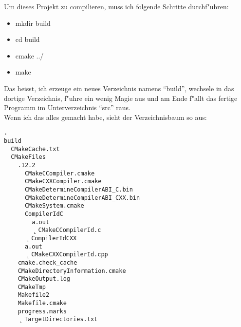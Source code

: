 \documentclass[german,a4paper]{report}
\begin{document}
Um dieses Projekt zu compilieren, muss ich folgende Schritte
durchf"uhren:
\begin{itemize}
\item mkdir build
\item cd build
\item cmake ../
\item make
\end{itemize}
Das heisst, ich erzeuge ein neues Verzeichnis namens ``build'',
wechsele in das dortige Verzeichnis, f"uhre ein wenig Magie aus
und am Ende f"allt das fertige Programm im Unterverzeichnis ``src''
raus.\\
Wenn ich das alles gemacht habe, sieht der Verzeichnisbaum so aus:
\begin{alltt}
.
\textbar\textendash\textendash build
\textbar\ \  \textbar\textendash\textendash CMakeCache.txt
\textbar\ \  \textbar\textendash\textendash CMakeFiles
\textbar\ \  \textbar\ \  \textbar\textendash{}.12.2
\textbar\ \  \textbar\ \  \textbar\ \  \textbar\textendash\textendash CMakeCCompiler.cmake
\textbar\ \  \textbar\ \  \textbar\ \  \textbar\textendash\textendash CMakeCXXCompiler.cmake
\textbar\ \  \textbar\ \  \textbar\ \  \textbar\textendash\textendash CMakeDetermineCompilerABI\_C.bin
\textbar\ \  \textbar\ \  \textbar\ \  \textbar\textendash\textendash CMakeDetermineCompilerABI\_CXX.bin
\textbar\ \  \textbar\ \  \textbar\ \  \textbar\textendash\textendash CMakeSystem.cmake
\textbar\ \  \textbar\ \  \textbar\ \  \textbar\textendash\textendash CompilerIdC
\textbar\ \  \textbar\ \  \textbar\ \  \textbar\ \  \textbar\textendash\textendash a.out
\textbar\ \  \textbar\ \  \textbar\ \  \textbar\ \  \(\llcorner\)\textendash\textendash CMakeCCompilerId.c
\textbar\ \  \textbar\ \  \textbar\ \  \(\llcorner\)\textendash\textendash CompilerIdCXX
\textbar\ \  \textbar\ \  \textbar\ \      \textbar\textendash\textendash a.out
\textbar\ \  \textbar\ \  \textbar\ \      \(\llcorner\)\textendash\textendash CMakeCXXCompilerId.cpp
\textbar\ \  \textbar\ \  \textbar\textendash\textendash cmake.check\_cache
\textbar\ \  \textbar\ \  \textbar\textendash\textendash CMakeDirectoryInformation.cmake
\textbar\ \  \textbar\ \  \textbar\textendash\textendash CMakeOutput.log
\textbar\ \  \textbar\ \  \textbar\textendash\textendash CMakeTmp
\textbar\ \  \textbar\ \  \textbar\textendash\textendash Makefile2
\textbar\ \  \textbar\ \  \textbar\textendash\textendash Makefile.cmake
\textbar\ \  \textbar\ \  \textbar\textendash\textendash progress.marks
\textbar\ \  \textbar\ \  \(\llcorner\)\textendash\textendash TargetDirectories.txt

\end{alltt}
\end{document}
